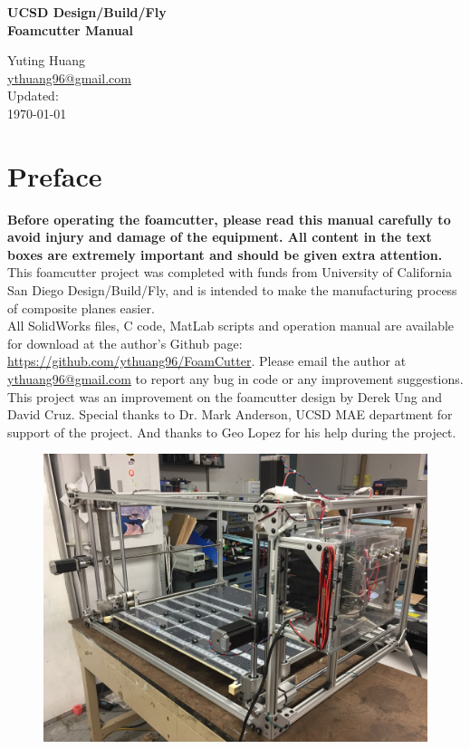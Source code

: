 \documentclass[titlepage,12pt,letter]{report}
\numberwithin{equation}{chapter}
\begin{document}
\begin{titlepage}
	\centering
	\vspace*{2.5in}
	{\huge\textbf{UCSD Design/Build/Fly\\Foamcutter Manual} \par}
	
	\vspace{2.5in}
	{\large Yuting Huang \\
		\href{mailto:ythuang96@gmail.com}{ythuang96@gmail.com}} \\
	\vspace{1.5in}
	{\large
		Updated: \\
		\today }
	\vspace{1in}
\end{titlepage}

\chapter*{Preface}
\textbf{Before operating the foamcutter, please read this manual carefully to avoid injury and damage of the equipment. All content in the text boxes are extremely important and should be given extra attention.} \\ 

This foamcutter project was completed with funds from University of California San Diego Design/Build/Fly, and is intended to make the manufacturing process of composite planes easier. \\

All SolidWorks files, C code, MatLab scripts and operation manual are available for download at the author's Github page: \href{https://github.com/ythuang96/FoamCutter}{https://github.com/ythuang96/FoamCutter}. Please email the author at \href{mailto:ythuang96@gmail.com}{ythuang96@gmail.com} to report any bug in code or any improvement suggestions. \\

This project was an improvement on the foamcutter design by Derek Ung and David Cruz. Special thanks to Dr. Mark Anderson, UCSD MAE department for support of the project. And thanks to Geo Lopez for his help during the project.\\

\begin{figure} [H]
	\includegraphics[width = 0.65\linewidth]{./Figures/overview.jpg}
\end{figure}
\end{document}
